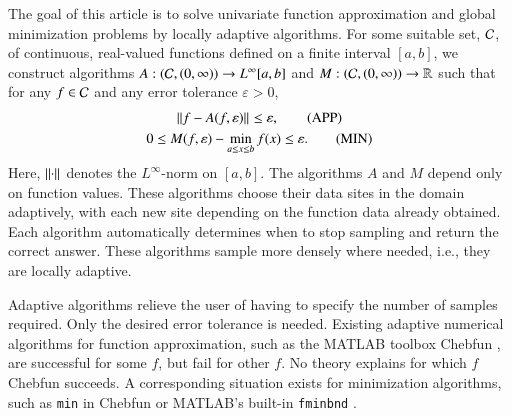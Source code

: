 \documentclass[review]{elsarticle}
\newcommand{\abstol}{\varepsilon}
\theoremstyle{definition}
\begin{document}
The goal of this article is to solve univariate function approximation and
global minimization problems by locally adaptive algorithms. For some suitable
set, $\mathcal{C}$, of continuous, real-valued functions defined on a finite interval
$[a,b]$, we construct algorithms $A:(\mathcal{C},(0,\infty)) \to L^{\infty}[a,b]$ and
$M: (\mathcal{C},(0,\infty)) \to \mathbb{R}$ such that for any $f \in \mathcal{C}$ and any error
tolerance $\abstol > 0$,
\begin{gather}
\norm{f - A(f,\abstol)} \le \abstol,  \tag{APP} \label{appxprob} \\
0 \le M(f,\abstol) - \min_{a \le x \le b} f(x)  \le \abstol. \tag{MIN} \label{optprob}
\end{gather}
Here, $\left \lVert \cdot \right \rVert_{{}}$ denotes the $L^{\infty}$-norm on $[a,b]$. The algorithms
$A$ and $M$ depend only on function values. These algorithms choose their data
sites in the domain adaptively, with each new site depending on the function
data already obtained. Each algorithm automatically determines when to stop
sampling and return the correct answer. These algorithms sample more densely
where needed, i.e., they are locally adaptive.

Adaptive algorithms relieve the user of having to specify the number of samples
required. Only the desired error tolerance is needed. Existing adaptive
numerical algorithms for function approximation, such as the MATLAB toolbox
Chebfun \citep{TrefEtal16a}, are successful for some $f$, but fail for other
$f$. No theory explains for which $f$ Chebfun succeeds. A corresponding
situation exists for minimization algorithms, such as \texttt{min} in Chebfun or
MATLAB's built-in \texttt{fminbnd} \citep{MAT9.0}.
\end{document}
